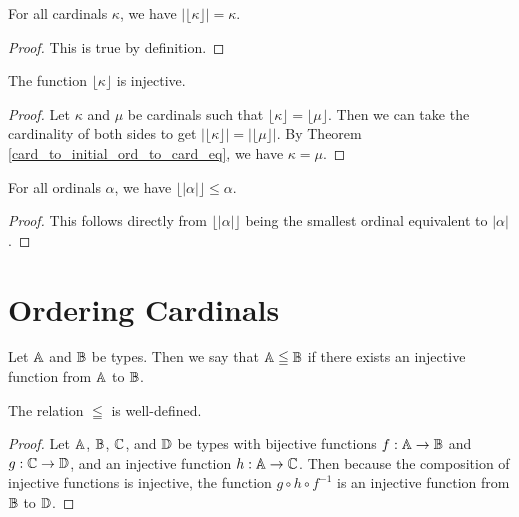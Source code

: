 \documentclass[../../math.tex]{subfiles}
\begin{document}
\begin{theorem} \label{card_to_initial_ord_to_card_eq}
    For all cardinals $\kappa$, we have $|\lfloor \kappa \rfloor| = \kappa$.
\end{theorem}
\begin{proof}
    This is true by definition.
\end{proof}

\begin{instance}
    The function $\lfloor \kappa \rfloor$ is injective.
\end{instance}
\begin{proof}
    Let $\kappa$ and $\mu$ be cardinals such that $\lfloor \kappa \rfloor =
    \lfloor \mu \rfloor$.  Then we can take the cardinality of both sides to get
    $|\lfloor \kappa \rfloor| = |\lfloor \mu \rfloor|$.  By Theorem
    \ref{card_to_initial_ord_to_card_eq}, we have $\kappa = \mu$.
\end{proof}

\begin{theorem} \label{ord_to_card_to_initial_ord_le}
    For all ordinals $\alpha$, we have $\lfloor|\alpha|\rfloor \leq \alpha$.
\end{theorem}
\begin{proof}
    This follows directly from $\lfloor|\alpha|\rfloor$ being the smallest
    ordinal equivalent to $|\alpha|$.
\end{proof}

\section{Ordering Cardinals}

\begin{definition}
    Let $\mathbb{A}$ and $\mathbb{B}$ be types.  Then we say that $\mathbb{A} \leqq \mathbb{B}$ if there exists
    an injective function from $\mathbb{A}$ to $\mathbb{B}$.
\end{definition}

\begin{lemma}
    The relation $\leqq$ is well-defined.
\end{lemma}
\begin{proof}
    Let $\mathbb{A}$, $\mathbb{B}$, $\mathbb{C}$, and $\mathbb{D}$ be types with bijective functions $f : \mathbb{A} \to
    \mathbb{B}$ and $g : \mathbb{C} \to \mathbb{D}$, and an injective function $h : \mathbb{A} \to \mathbb{C}$.  Then
    because the composition of injective functions is injective, the function $g
    \circ h \circ f^{-1}$ is an injective function from $\mathbb{B}$ to $\mathbb{D}$.
\end{proof}
\end{document}
